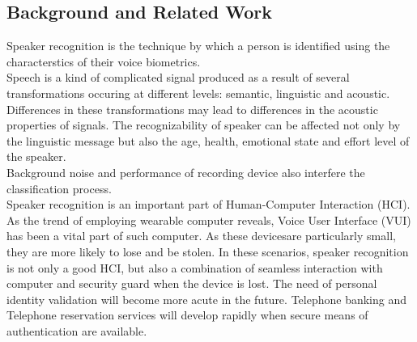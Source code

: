 \subsection{Background and Related Work}
Speaker recognition is the technique by which a person is identified using the characterstics of their voice biometrics. \\
Speech is a kind of complicated signal produced as a result of several transformations occuring at different levels: semantic, linguistic and acoustic. Differences in these transformations may lead to differences in the acoustic properties of signals. The recognizability of speaker can be affected not only by the linguistic message but also the age, health, emotional state and effort level of the speaker. \\
Background noise and performance of recording device also interfere the classification process. \\
Speaker recognition is an important part of Human-Computer Interaction (HCI). As the trend of employing wearable computer reveals, Voice User Interface (VUI) has been a vital part of such computer. As these devicesare particularly small, they are more likely to lose and be stolen. In these scenarios, speaker recognition is not only a good HCI, but also a combination of seamless interaction with computer and security guard when the device is lost. The need of personal identity validation will become more acute in the future. Telephone banking and Telephone reservation services will develop rapidly when secure means of authentication are available. \\
